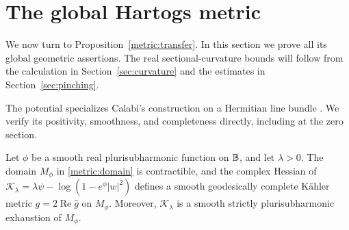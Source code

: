 \section{The global Hartogs metric}\label{sec:hartogs}

We now turn to Proposition~\ref{metric:transfer}.  In this section we
prove all its global geometric assertions.  The real sectional-curvature
bounds will follow from the calculation in Section~\ref{sec:curvature}
and the estimates in Section~\ref{sec:pinching}.

The potential specializes Calabi's construction on a Hermitian line
bundle \cite[Section~3]{Calabi1979}. We verify its positivity,
smoothness, and completeness directly, including at the zero section.

\begin{lemma}\label{metric:complete}
Let $\phi$ be a smooth real plurisubharmonic function on $\mathbb B$, and let
$\lambda>0$.  The domain $M_\phi$ in \eqref{metric:domain} is
contractible, and the complex Hessian of
$\mathcal K_\lambda=\lambda\psi-\log(1-e^\phi|w|^2)$ defines a smooth
geodesically complete K\"ahler metric
$g=2\operatorname{Re}\widehat g$ on $M_\phi$.
Moreover, $\mathcal K_\lambda$ is a smooth strictly plurisubharmonic
exhaustion of $M_\phi$.
\end{lemma}

